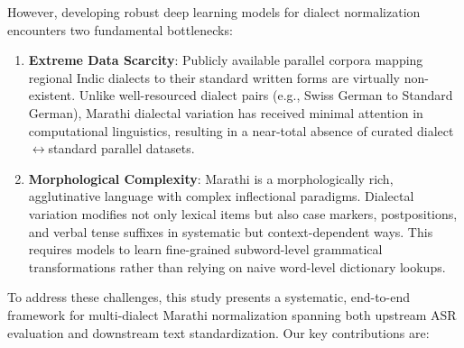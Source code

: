 However, developing robust deep learning models for dialect normalization encounters two fundamental bottlenecks:

\begin{enumerate}
    \item \textbf{Extreme Data Scarcity}: Publicly available parallel corpora mapping regional Indic dialects to their standard written forms are virtually non-existent. Unlike well-resourced dialect pairs (e.g., Swiss German to Standard German), Marathi dialectal variation has received minimal attention in computational linguistics, resulting in a near-total absence of curated dialect$\leftrightarrow$standard parallel datasets.
    \item \textbf{Morphological Complexity}: Marathi is a morphologically rich, agglutinative language with complex inflectional paradigms. Dialectal variation modifies not only lexical items but also case markers, postpositions, and verbal tense suffixes in systematic but context-dependent ways. This requires models to learn fine-grained subword-level grammatical transformations rather than relying on naive word-level dictionary lookups.
\end{enumerate}

To address these challenges, this study presents a systematic, end-to-end framework for multi-dialect Marathi normalization spanning both upstream ASR evaluation and downstream text standardization. Our key contributions are:

